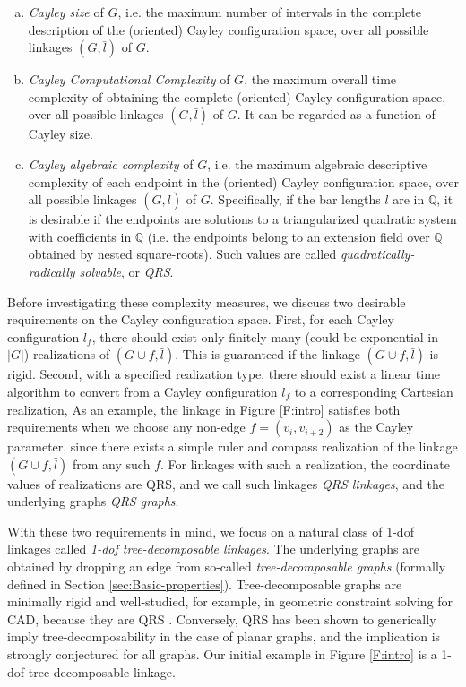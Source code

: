 \documentclass[secthm,amsthm,english]{article}
\theoremstyle{definition}
\theoremstyle{remark}
\begin{document}
\begin{enumerate}[(a)]
	\item \emph{Cayley size} of $G$, i.e. the maximum number of intervals in the complete description of the (oriented) Cayley configuration space, 
			over all possible linkages $(G, \bar{l})$ of $G$. 
	
	\item \emph{Cayley Computational Complexity} of $G$, the maximum overall time complexity of obtaining the complete  (oriented) Cayley configuration space, 
			over all possible linkages $(G, \bar{l})$ of $G$. 
			It can be regarded as a function of Cayley size.

	\item \emph{Cayley algebraic complexity} of $G$, i.e. the maximum algebraic descriptive complexity of each endpoint in the  (oriented) Cayley configuration space,  
			over all possible linkages $(G, \bar{l})$ of $G$. 
			Specifically, if the bar lengths $\bar{l}$ are in $\mathbb{Q}$, 
			it is desirable if the endpoints are solutions to a triangularized quadratic system with coefficients in $\mathbb{Q}$ 
			(i.e. the endpoints belong to an extension field over $\mathbb{Q}$ obtained by nested square-roots). 
			Such values are called \emph{quadratically-radically solvable}, or \emph{QRS}.
\end{enumerate}


Before investigating these complexity measures, 
we discuss two desirable requirements 
on the Cayley configuration space. 
First, for each Cayley configuration $l_f$,
there should exist only finitely many (could be exponential in $|G|$) 
realizations of $(G\cup f,\bar{l})$. 
This is guaranteed if the linkage $(G\cup f, \bar{l})$ is rigid. 
Second, with a specified realization type, 
there should exist a linear time algorithm to convert 
from a Cayley configuration $l_f$ to a corresponding Cartesian realization, 
As an example, the linkage in Figure \ref{F:intro} satisfies both requirements 
when we choose any non-edge $f=(v_i, v_{i+2})$ as the Cayley parameter, 
since there exists a simple ruler and compass realization of the linkage $(G \cup f, \bar{l})$ from any such $f$. 
For linkages with such a realization, the coordinate values of realizations are QRS, 
and we call such linkages \emph{QRS linkages}, and the underlying graphs \emph{QRS graphs}. 


With these two requirements in mind, 
we focus on a natural class of 1-dof linkages called \emph{1-dof tree-decomposable linkages}. 
The underlying graphs are obtained by dropping an edge from so-called \emph{tree-decomposable graphs} (formally defined in Section \ref{sec:Basic-properties}). 
Tree-decomposable graphs are 
minimally rigid and well-studied, for example, in geometric constraint solving for CAD, because they are QRS \cite{bib:FudHo97}. 
Conversely, QRS has
been shown \cite{bib:Owen02} to generically imply tree-decomposability
in the case of  planar graphs, and the implication is strongly conjectured for
all graphs. 
Our initial example in Figure \ref{F:intro} is a 1-dof tree-decomposable linkage.
\end{document}
